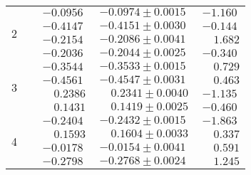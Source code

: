\begin{table}[htbp]
\begin{center}
\begin{tabular}{l|c|c|c|c}
 \multirow{4}{*}{2}	&	\ACPL 	&$	-0.0956	$&$	-0.0974		\pm		0.0015	$&$	-1.160	 $\\
	&	\ACPS 	&$	-0.4147	$&$	-0.4151		\pm		0.0030	$&$	-0.144	 $\\
	&	\ACPpa 	&$	-0.2154	$&$	-0.2086		\pm		0.0041	$&$	\phantom{-}1.682	 $\\
	&	\ACPpe 	&$	-0.2036	$&$	-0.2044		\pm		0.0025	$&$	-0.340	 $\\
													
\hline													
													
 \multirow{4}{*}{3}	&	\ACPL 	&$	-0.3544	$&$	-0.3533		\pm		0.0015	$&$	\phantom{-}0.729	 $\\
	&	\ACPS 	&$	-0.4561	$&$	-0.4547		\pm		0.0031	$&$	\phantom{-}0.463	 $\\
	&	\ACPpa 	&$	\phantom{-}0.2386	$&$	\phantom{-}0.2341		\pm		0.0040	$&$	-1.135	 $\\
	&	\ACPpe 	&$	\phantom{-}0.1431	$&$	\phantom{-}0.1419		\pm		0.0025	$&$	-0.460	 $\\
													
\hline													
													
 \multirow{4}{*}{4}	&	\ACPL 	&$	-0.2404	$&$	-0.2432		\pm		0.0015	$&$	-1.863	 $\\
	&	\ACPS 	&$	\phantom{-}0.1593	$&$	\phantom{-}0.1604		\pm		0.0033	$&$	\phantom{-}0.337	 $\\
	&	\ACPpa 	&$	-0.0178	$&$	-0.0154		\pm		0.0041	$&$	\phantom{-}0.591	 $\\
	&	\ACPpe 	&$	-0.2798	$&$	-0.2768		\pm		0.0024	$&$	\phantom{-}1.245	 $\\

 \end{tabular}
\vspace{-20pt}
\end{center}
\end{table}
%
